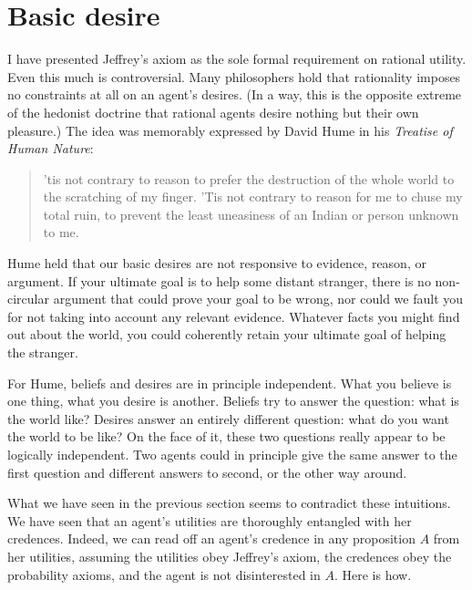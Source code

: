\section{Basic desire}\label{sec:basic-desire}

I have presented Jeffrey's axiom as the sole formal requirement on rational
utility.
Even this much is controversial. Many philosophers hold that
rationality imposes no constraints at all on an agent's desires. (In a way, this
is the opposite extreme of the hedonist doctrine that rational agents desire
nothing but their own pleasure.) The idea was memorably expressed by David Hume
in his \emph{Treatise of Human Nature}:

\begin{quote}
  'tis not contrary to reason to prefer the destruction of the whole
  world to the scratching of my finger. 'Tis not contrary to reason
  for me to chuse my total ruin, to prevent the least uneasiness of an
  Indian or person unknown to me.
\end{quote}

Hume held that our basic desires are not responsive to evidence, reason, or
argument. If your ultimate goal is to help some distant stranger, there is no
non-circular argument that could prove your goal to be wrong, nor could we fault
you for not taking into account any relevant evidence. Whatever facts you might
find out about the world, you could coherently retain your ultimate goal of
helping the stranger.

For Hume, beliefs and desires are in principle independent. What you believe is
one thing, what you desire is another. Beliefs try to answer the question: what
is the world like? Desires answer an entirely different question: what do you
want the world to be like? On the face of it, these two questions really appear
to be logically independent. Two agents could in principle give the same answer
to the first question and different answers to second, or the other way around.

What we have seen in the previous section seems to contradict these intuitions.
We have seen that an agent's utilities are thoroughly entangled with her
credences. Indeed, we can read off an agent's credence in any proposition $A$
from her utilities, assuming the utilities obey Jeffrey's axiom, the credences
obey the probability axioms, and the agent is not disinterested in $A$. Here
is how.

